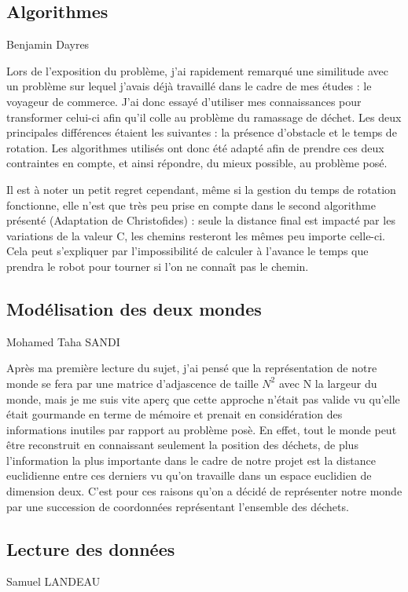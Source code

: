 \documentclass{article}
\begin{document}
\subsection{Algorithmes}
Benjamin Dayres

Lors de l'exposition du problème, j'ai rapidement remarqué une similitude avec un problème sur lequel j'avais déjà travaillé dans le cadre de mes études : le voyageur de commerce.
J'ai donc essayé d'utiliser mes connaissances pour transformer celui-ci afin qu'il colle au problème du ramassage de déchet. Les deux principales différences étaient les suivantes : la présence d'obstacle et le temps de rotation.
Les algorithmes utilisés ont donc été adapté afin de prendre ces deux contraintes en compte, et ainsi répondre, du mieux possible, au problème posé. \newline

Il est à noter un petit regret cependant, même si la gestion du temps de rotation fonctionne, 
elle n'est que très peu prise en compte dans le second algorithme présenté (Adaptation de Christofides) : seule la distance final est impacté par les variations de la valeur C, les chemins resteront les mêmes peu importe celle-ci. 
Cela peut s'expliquer par l'impossibilité de calculer à l'avance le temps que prendra le robot pour tourner si l'on ne connaît pas le chemin.

\subsection{Mod\'elisation des deux mondes}
Mohamed Taha SANDI

Apr\`es ma premi\`ere lecture du sujet, j'ai pens\'e que la repr\'esentation de notre monde se fera par une matrice d'adjascence de taille $N^2$ avec N la largeur du monde, mais je me suis 
vite aper\c{c} que cette approche n'\'etait pas valide vu qu'elle \'etait gourmande en terme de m\'emoire et prenait en consid\'eration des informations inutiles par rapport au probl\`eme pos\`e. En effet, tout le monde peut \^etre reconstruit
en connaissant seulement la position des d\'echets, de plus l'information la plus importante dans le cadre de notre projet est la distance euclidienne entre ces derniers vu qu'on travaille dans un espace euclidien 
de dimension deux. C'est pour ces raisons qu'on a d\'ecid\'e de repr\'esenter notre monde par une succession de coordonn\'ees repr\'esentant l'ensemble des d\'echets.


\subsection{Lecture des données}
Samuel LANDEAU
\end{document}
